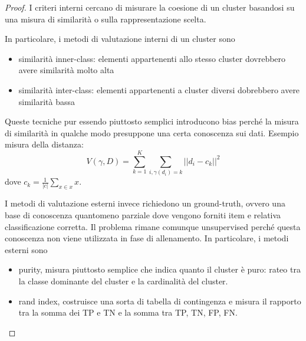 \documentclass[12pt,a4paper,oneside]{book}
\begin{document}
\begin{proof}
	I criteri interni cercano di misurare la coesione di un cluster basandosi su una misura di similarità o sulla rappresentazione scelta.
	
	In particolare, i metodi di valutazione interni di un cluster sono
	\begin{itemize}
		\item similarità inner-class: elementi appartenenti allo stesso cluster dovrebbero avere similarità molto alta
		\item similarità inter-class: elementi appartenenti a cluster diversi dobrebbero avere similarità bassa
	\end{itemize}
	Queste tecniche pur essendo piuttosto semplici introducono bias perché la misura di similarità in qualche modo presuppone una certa conoscenza sui dati.
	Esempio misura della distanza: \[
		V(\gamma, D) = \sum_{k = 1}^{K} \sum_{i, \gamma(d_i) = k} || d_i - c_k ||^2
	\]
	dove $c_k = \frac{1}{|c|} \sum_{x \in x} x$.
	
	I metodi di valutazione esterni invece richiedono un ground-truth, ovvero una base di conoscenza quantomeno parziale dove vengono forniti item e relativa classificazione corretta. Il problema rimane comunque unsupervised perché questa conoscenza non viene utilizzata in fase di allenamento. In particolare, i metodi esterni sono
	\begin{itemize}
		\item purity, misura piuttosto semplice che indica quanto il cluster è puro: rateo tra la classe dominante del cluster e la cardinalità del cluster.
		\item rand index, costruisce una sorta di tabella di contingenza e misura il rapporto tra la somma dei TP e TN e la somma tra TP, TN, FP, FN.
	\end{itemize}
\end{proof}
\end{document}
